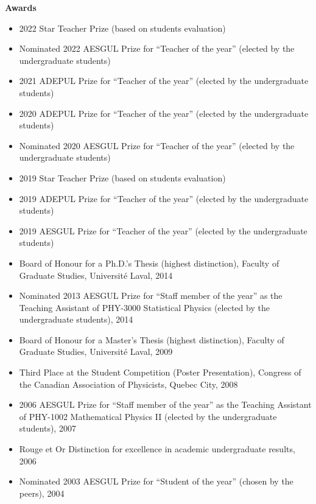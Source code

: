 \documentclass[11pt]{article}
\newcommand{\TitreSection}[1]{\colorbox{background}{\makebox[\textwidth-0.5em][c]{\Large\textrm{\textsc{#1}}}}\vspace{0.75\baselineskip}\\}
\begin{document}
%
%
%
\textbf{Awards}
%
\begin{itemize}
  \item 2022 Star Teacher Prize (based on students evaluation)
  \item Nominated 2022 AESGUL Prize for ``Teacher of the year'' (elected by the undergraduate students)
  \item 2021 ADEPUL Prize for ``Teacher of the year'' (elected by the undergraduate students)
  \item 2020 ADEPUL Prize for ``Teacher of the year'' (elected by the undergraduate students)
  \item Nominated 2020 AESGUL Prize for ``Teacher of the year'' (elected by the undergraduate students)
  \item 2019 Star Teacher Prize (based on students evaluation)
  \item 2019 ADEPUL Prize for ``Teacher of the year'' (elected by the undergraduate students)
  \item 2019 AESGUL Prize for ``Teacher of the year'' (elected by the undergraduate students)
  \item Board of Honour for a Ph.D.'s Thesis (highest distinction), Faculty of Graduate Studies, Universit\'e Laval, 2014
  \item Nominated 2013 AESGUL Prize for ``Staff member of the year'' as the Teaching Assistant of PHY-3000 Statistical Physics (elected by the undergraduate students), 2014
  \item Board of Honour for a Master's Thesis (highest distinction), Faculty of Graduate Studies, Universit\'e Laval, 2009
  \item Third Place at the Student Competition (Poster Presentation), Congress of the Canadian Association of Physicists, Quebec City, 2008
  \item 2006 AESGUL Prize for ``Staff member of the year'' as the Teaching Assistant of PHY-1002 Mathematical Physics II (elected by the undergraduate students), 2007
  \item Rouge et Or Distinction for excellence in academic undergraduate results, 2006
  \item Nominated 2003 AESGUL Prize for ``Student of the year'' (chosen by the peers), 2004
\end{itemize} \vspace{0.75\baselineskip}
%
%
%
%
%
\TitreSection{Teaching}
\end{document}
